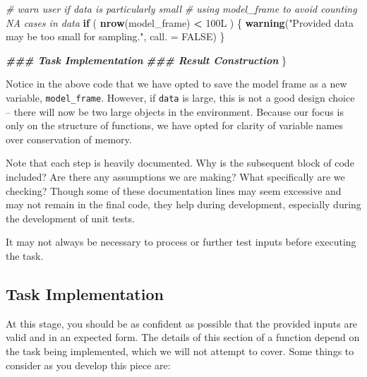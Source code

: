 \documentclass[
]{book}
\newenvironment{Shaded}{\begin{snugshade}}{\end{snugshade}}
\newcommand{\AttributeTok}[1]{\textcolor[rgb]{0.13,0.29,0.53}{#1}}
\newcommand{\CommentTok}[1]{\textcolor[rgb]{0.56,0.35,0.01}{\textit{#1}}}
\newcommand{\ConstantTok}[1]{\textcolor[rgb]{0.56,0.35,0.01}{#1}}
\newcommand{\ControlFlowTok}[1]{\textcolor[rgb]{0.13,0.29,0.53}{\textbf{#1}}}
\newcommand{\DocumentationTok}[1]{\textcolor[rgb]{0.56,0.35,0.01}{\textbf{\textit{#1}}}}
\newcommand{\FunctionTok}[1]{\textcolor[rgb]{0.13,0.29,0.53}{\textbf{#1}}}
\newcommand{\NormalTok}[1]{#1}
\newcommand{\SpecialCharTok}[1]{\textcolor[rgb]{0.81,0.36,0.00}{\textbf{#1}}}
\newcommand{\StringTok}[1]{\textcolor[rgb]{0.31,0.60,0.02}{#1}}
\begin{document}
\begin{Shaded}
\begin{Highlighting}[]
  \CommentTok{\# warn user if data is particularly small}
  \CommentTok{\# using model\_frame to avoid counting NA cases in data}
  \ControlFlowTok{if}\NormalTok{ ( }\FunctionTok{nrow}\NormalTok{(model\_frame) }\SpecialCharTok{\textless{}}\NormalTok{ 100L ) \{}
    \FunctionTok{warning}\NormalTok{(}\StringTok{"Provided \textasciigrave{}data\textasciigrave{} may be too small for sampling."}\NormalTok{, }\AttributeTok{call. =} \ConstantTok{FALSE}\NormalTok{)}
\NormalTok{  \}}

  \DocumentationTok{\#\#\# Task Implementation}
  \DocumentationTok{\#\#\# Result Construction}
\NormalTok{\}}
\end{Highlighting}
\end{Shaded}

Notice in the above code that we have opted to save the model frame as a new variable, \texttt{model\_frame}. However, if \texttt{data} is large, this is not a good design choice -- there will now be two large objects in the environment. Because our focus is only on the structure of functions, we have opted for clarity of variable names over conservation of memory.

Note that each step is heavily documented. Why is the subsequent block of code included? Are there any assumptions we are making? What specifically are we checking? Though some of these documentation lines may seem excessive and may not remain in the final code, they help during development, especially during the development of unit tests.

It may not always be necessary to process or further test inputs before executing the task.

\hypertarget{task-implementation}{%
\subsection{Task Implementation}\label{task-implementation}}

At this stage, you should be as confident as possible that the provided inputs are valid and in an expected form. The details of this section of a function depend on the task being implemented, which we will not attempt to cover. Some things to consider as you develop this piece are:
\end{document}
